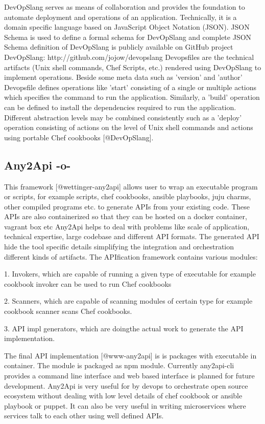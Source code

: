 DevOpSlang serves as means of collaboration and provides the
foundation to automate deployment and operations of an
application. Technically, it is a domain specific language based on
JavaScript Object Notation (JSON). JSON Schema is used to define a
formal schema for DevOpSlang and complete JSON Schema definition of
DevOpSlang is publicly available on GitHub project DevOpSlang:
http://github.com/jojow/devopslang Devopsfiles are the technical
artifacts (Unix shell commands, Chef Scripts, etc.)  rendered using
DevOpSlang to implement operations.  Beside some meta data such as
'version' and 'author' Devopsfile defines operations like 'start'
consisting of a single or multiple actions which specifies the command
to run the application. Similarly, a 'build' operation can be defined
to install the dependencies required to run the application. Different
abstraction levels may be combined consistently such as a 'deploy'
operation consisting of actions on the level of Unix shell commands
and actions using portable Chef cookbooks [@DevOpSlang].

\subsection{Any2Api -o-}

This framework [@wettinger-any2api] allows user to wrap an
executable program or scripts, for example scripts, chef cookbooks,
ansible playbooks, juju charms, other compiled programs etc. to
generate APIs from your existing code.  These APIs are also
containerized so that they can be hosted on a docker container,
vagrant box etc Any2Api helps to deal with problems like scale of
application, technical expertise, large codebase and different API
formats. The generated API hide the tool specific details simplifying
the integration and orchestration different kinds of artifacts. The
APIfication framework contains various modules:

     1. Invokers, which are capable of running a given type of
        executable for example cookbook invoker can be used to run Chef
        cookbooks

     2. Scanners, which are capable of scanning modules of certain type for
        example cookbook scanner scans Chef cookbooks.

     3. API impl generators, which are doingthe actual work to
        generate the API implementation.

        The final API implementation [@www-any2api] is is packages
        with executable in container.  The module is packaged as npm
        module. Currently any2api-cli provides a command line
        interface and web based interface is planned for future
        development. Any2Api is very useful for by devops to
        orchestrate open source ecosystem without dealing with low
        level details of chef cookbook or ansible playbook or
        puppet. It can also be very useful in writing microservices
        where services talk to each other using well defined APIs.


